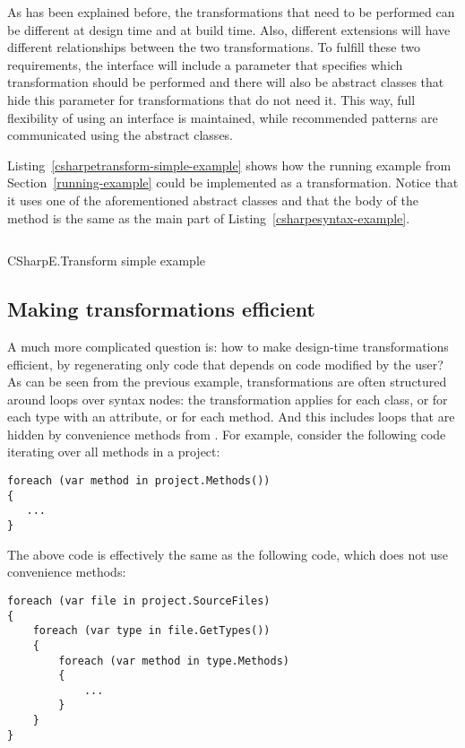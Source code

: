 As has been explained before, the transformations that need to be performed can be different at design time and at build time. Also, different extensions will have different relationships between the two transformations. To fulfill these two requirements, the interface will include a parameter that specifies which transformation should be performed and there will also be abstract classes that hide this parameter for transformations that do not need it. This way, full flexibility of using an interface is maintained, while recommended patterns are communicated using the abstract classes.

Listing~\ref{csharpetransform-simple-example} shows how the running example from Section~\ref{running-example} could be implemented as a transformation. Notice that it uses one of the aforementioned abstract classes and that the body of the method is the same as the main part of Listing~\ref{csharpesyntax-example}.

\begin{listing}
\inputminted[firstline=9,lastline=27]{csharp}{samples/CSharpETransform.Simple/EntityTransformation.cs}
\caption{CSharpE.Transform simple example}
\label{csharpetransform-simple-example}
\end{listing}

\subsection{Making transformations efficient}

A much more complicated question is: how to make design-time transformations efficient, by regenerating only code that depends on code modified by the user? As can be seen from the previous example, transformations are often structured around  loops over syntax nodes: the transformation applies for each class, or for each type with an attribute, or for each method. And this includes  loops that are hidden by convenience methods from . For example, consider the following code iterating over all methods in a project:

\begin{verbatim}
foreach (var method in project.Methods())
{
   ...
}
\end{verbatim}

The above code is effectively the same as the following code, which does not use convenience methods:

\begin{verbatim}
foreach (var file in project.SourceFiles)
{
    foreach (var type in file.GetTypes())
    {
        foreach (var method in type.Methods)
        {
            ...
        }
    }
}
\end{verbatim}

